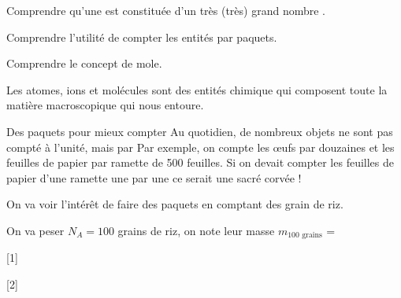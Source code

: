 \teteSndMole

\vspace*{-32pt}


\begin{objectifs}
  \item Comprendre qu'une  est constituée d'un très (très) grand nombre .
  \item Comprendre l'utilité de compter les entités par paquets.
  \item Comprendre le concept de mole.
\end{objectifs}

\begin{contexte}  
  Les atomes, ions et molécules sont des entités chimique qui composent toute la matière macroscopique qui nous entoure.
  
\end{contexte}


\vspace*{-8pt}

\begin{doc}{Des paquets pour mieux compter}
  Au quotidien, de nombreux objets ne sont pas compté à l'unité, mais par 
  Par exemple, on compte les œufs par douzaines et les feuilles de papier par ramette de 500 feuilles.
  Si on devait compter les feuilles de papier d'une ramette une par une ce serait une sacré corvée !

  On va voir l'intérêt de faire des paquets en comptant des grain de riz.
\end{doc}

\mesure On va peser $N_A = 100$ grains de riz, on note leur masse $m_\text{100 grains}$ = 

[1]

[2]

